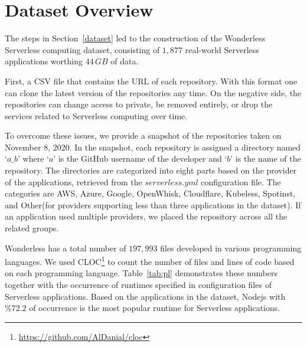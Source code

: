 
\section{Dataset Overview}
\label{schema}

The steps in Section~\ref{dataset} led to the construction of the 
Wonderless Serverless computing dataset, consisting of $1,877$
real-world Serverless applications worthing $44 \, GB$ of data. 

First, a CSV file that contains the URL of each repository. 
With this format one can clone the latest version of the repositories any time. 
On the negative side, the repositories can change access to private, 
be removed entirely, or drop the services related to Serverless computing 
over time. 

To overcome these issues, we provide a snapshot of the 
repositories taken on November 8, 2020. 
In the snapshot, each repository is assigned a directory named `$a\_b$' 
where `$a$' is the GitHub username of the developer and `$b$' is the name of the repository. 
The directories are categorized into eight parts based on the provider of the applications, 
retrieved from the $serverless.yml$ configuration file. 
The categories are AWS, Azure, Google, OpenWhisk, Cloudflare, Kubeless, 
Spotinst, and Other(for providers supporting less than three applications in the dataset).
If an application used multiple providers, we placed the repository across 
all the related groups. 

Wonderless has a total number of $197,993$ files developed in various programming languages. 
We used CLOC\footnote{\url{https://github.com/AlDanial/cloc}} to count the number of files and 
lines of code based on each programming language. Table~\ref{tab:pl} demonstrates these numbers 
together with the occurrence of runtimes specified in configuration files of Serverless applications. 
Based on the applications in the dataset, Nodejs with $\%72.2$ of occurrence is the most popular runtime 
for Serverless applications.

